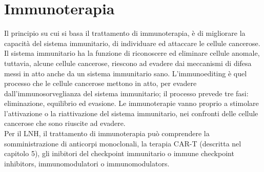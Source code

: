\section{Immunoterapia}
Il principio su cui si basa il trattamento di immunoterapia, è di migliorare la capacità 
del sistema immunitario, di individuare ed attaccare le cellule cancerose.\\ 
Il sistema immunitario ha la funzione di riconoscere ed eliminare cellule anomale, tuttavia, alcune cellule cancerose, 
riescono ad evadere dai meccanismi di difesa messi in atto anche da un sistema immunitario sano. 
L’immunoediting è quel processo che le cellule cancerose mettono in atto, per evadere dall’immunosorveglianza del 
sistema immunitario; il processo prevede tre fasi: eliminazione, equilibrio ed evasione. Le immunoterapie vanno 
proprio a stimolare l’attivazione o la riattivazione del sistema immunitario, nei confronti delle cellule cancerose 
che sono riuscite ad evadere\cite{IMMUNOTP}.\\
Per il LNH, il trattamento di immunoterapia può comprendere la somministrazione di anticorpi monoclonali, 
la terapia CAR-T (descritta nel capitolo 5), 
gli inibitori del checkpoint immunitario o immune checkpoint inhibitors, 
immunomodulatori o immunomodulators.

